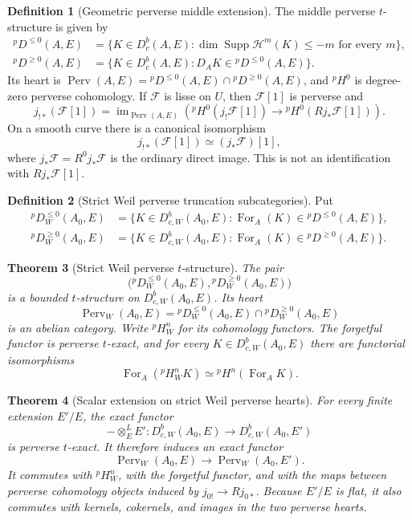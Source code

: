\documentclass[10pt]{article}
\newtheorem{theorem}{Theorem}[section]
\theoremstyle{definition}
\newtheorem{definition}[theorem]{Definition}
\newcommand{\Dbc}{D^b_c}
\newcommand{\DbcW}{D^b_{c,W}}
\newcommand{\Perv}{\operatorname{Perv}}
\newcommand{\PervW}{\operatorname{Perv}_W}
\begin{document}
\begin{definition}[Geometric perverse middle extension]
The middle perverse \(t\)-structure is given by
\[
\begin{aligned}
 {}^pD^{\le0}(A,E)
 &=\{K\in\Dbc(A,E):\dim\operatorname{Supp}\mathcal H^m(K)\le -m
       \text{ for every }m\},\\
 {}^pD^{\ge0}(A,E)
 &=\{K\in\Dbc(A,E):D_AK\in{}^pD^{\le0}(A,E)\}.
\end{aligned}
\]
Its heart is
\(\Perv(A,E)={}^pD^{\le0}(A,E)\cap{}^pD^{\ge0}(A,E)\), and
\({}^pH^0\) is degree-zero perverse cohomology.  If \(\mathcal F\) is
lisse on \(U\), then \(\mathcal F[1]\) is perverse and
\[
 j_{!*}(\mathcal F[1])=
 \operatorname{im}_{\Perv(A,E)}\!\left(
 {}^pH^0(j_!\mathcal F[1])\longrightarrow
 {}^pH^0(Rj_*\mathcal F[1])\right).
\]
On a smooth curve there is a canonical isomorphism
\[
                       j_{!*}(\mathcal F[1])\simeq(j_*\mathcal F)[1],
\]
where \(j_*\mathcal F=R^0j_*\mathcal F\) is the ordinary direct image.
This is not an identification with \(Rj_*\mathcal F[1]\).
\end{definition}

\begin{definition}[Strict Weil perverse truncation subcategories]
Put
\[
 \begin{aligned}
 {}^pD_W^{\leq0}(A_0,E)
 &=\{K\in\DbcW(A_0,E):\operatorname{For}_A(K)\in{}^pD^{\leq0}(A,E)\},\\
 {}^pD_W^{\geq0}(A_0,E)
 &=\{K\in\DbcW(A_0,E):\operatorname{For}_A(K)\in{}^pD^{\geq0}(A,E)\}.
 \end{aligned}
\]
\end{definition}

\begin{theorem}[Strict Weil perverse \(t\)-structure]
The pair
\[
 \bigl({}^pD_W^{\leq0}(A_0,E),{}^pD_W^{\geq0}(A_0,E)\bigr)
\]
is a bounded \(t\)-structure on \(\DbcW(A_0,E)\).  Its heart
\[
 \PervW(A_0,E)=
 {}^pD_W^{\leq0}(A_0,E)\cap{}^pD_W^{\geq0}(A_0,E)
\]
is an abelian category.  Write \({}^pH_W^n\) for its cohomology functors.
The forgetful functor is perverse \(t\)-exact, and for every
\(K\in\DbcW(A_0,E)\) there are functorial isomorphisms
\[
 \operatorname{For}_A({}^pH_W^nK)
       \simeq{}^pH^n(\operatorname{For}_A K).
\]
\end{theorem}

\begin{theorem}[Scalar extension on strict Weil perverse hearts]
For every finite extension \(E'/E\), the exact functor
\[
 -\otimes_E^LE':\DbcW(A_0,E)\longrightarrow\DbcW(A_0,E')
\]
is perverse \(t\)-exact.  It therefore induces an exact functor
\[
 \PervW(A_0,E)\longrightarrow\PervW(A_0,E').
\]
It commutes with \({}^pH_W^n\), with the forgetful functor, and with the
maps between perverse cohomology objects induced by \(j_{0!}\to Rj_{0*}\).
Because \(E'/E\) is flat, it also commutes with kernels, cokernels, and
images in the two perverse hearts.
\end{theorem}
\end{document}
